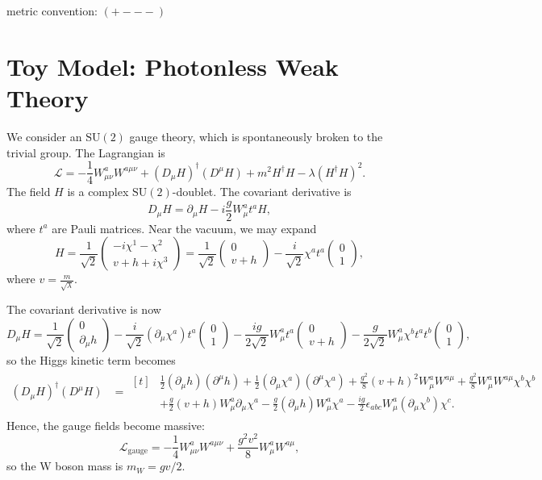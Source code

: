 \documentclass[11pt]{article}
\theoremstyle{definition}
\theoremstyle{remark}
\begin{document}
metric convention: $(+---)$
\section{Toy Model: Photonless Weak Theory}
	We consider an $\mathrm{SU}(2)$ gauge theory, which is spontaneously broken to the trivial group.
	The Lagrangian is
	\[\mathcal{L}=-\frac{1}{4}W^{a}_{\mu\nu}W^{a\mu\nu}+(D_{\mu}H)^{\dagger}(D^{\mu}H)+m^{2}H^{\dagger}H-\lambda(H^{\dagger}H)^{2}.\]
	The field $H$ is a complex $\mathrm{SU}(2)$-doublet.
	The covariant derivative is
	\[D_{\mu}H=\partial_{\mu}H-i\frac{g}{2}W^{a}_{\mu}t^{a}H,\]
	where $t^{a}$ are Pauli matrices.
	Near the vacuum, we may expand
	\[H=\frac{1}{\sqrt{2}}\begin{pmatrix}-i\chi^{1}-\chi^{2}\\v+h+i\chi^{3}\end{pmatrix}=\frac{1}{\sqrt{2}}\begin{pmatrix}0\\v+h\end{pmatrix}-\frac{i}{\sqrt{2}}\chi^{a}t^{a}\begin{pmatrix}0\\1\end{pmatrix},\]
	where $v=\frac{m}{\sqrt{\lambda}}$.
	
	The covariant derivative is now
	\[D_{\mu}H=\frac{1}{\sqrt{2}}\begin{pmatrix}0\\\partial_{\mu}h\end{pmatrix}-\frac{i}{\sqrt{2}}(\partial_{\mu}\chi^{a})t^{a}\begin{pmatrix}0\\1\end{pmatrix}-\frac{ig}{2\sqrt{2}}W^{a}_{\mu}t^{a}\begin{pmatrix}0\\v+h\end{pmatrix}-\frac{g}{2\sqrt{2}}W^{a}_{\mu}\chi^{b}t^{a}t^{b}\begin{pmatrix}0\\1\end{pmatrix},\]
	so the Higgs kinetic term becomes
	\begin{align*}
		(D_{\mu}H)^{\dagger}(D^{\mu}H)&=\begin{aligned}[t]
			&\frac{1}{2}(\partial_{\mu}h)(\partial^{\mu}h)+\frac{1}{2}(\partial_{\mu}\chi^{a})(\partial^{\mu}\chi^{a})+\frac{g^{2}}{8}(v+h)^{2}W^{a}_{\mu}W^{a\mu}+\frac{g^{2}}{8}W^{a}_{\mu}W^{a\mu}\chi^{b}\chi^{b}\\
			&+\frac{g}{2}(v+h)W^{a}_{\mu}\partial_{\mu}\chi^{a}-\frac{g}{2}(\partial_{\mu}h)W^{a}_{\mu}\chi^{a}-\frac{ig}{2}\epsilon_{abc}W^{a}_{\mu}(\partial_{\mu}\chi^{b})\chi^{c}.
		\end{aligned}
	\end{align*}
	Hence, the gauge fields become massive:
	\[\mathcal{L}_{\text{gauge}}=-\frac{1}{4}W^{a}_{\mu\nu}W^{a\mu\nu}+\frac{g^{2}v^{2}}{8}W^{a}_{\mu}W^{a\mu},\]
	so the W boson mass is $m_{W}=gv/2$.
	
\end{document}
